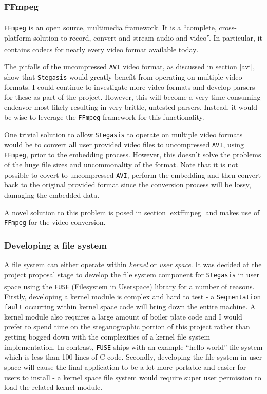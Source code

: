 \documentclass[paper=a4, fontsize=11pt,twoside]{scrartcl}
\numberwithin{table}{section}
\numberwithin{figure}{section}
\numberwithin{algorithm}{section}
\begin{document}
\subsubsection{FFmpeg}
\label{ffmpeg}

\texttt{FFmpeg} is an open source, multimedia framework\textsuperscript{\cite{ffmpeg}}. It is a ``complete, cross-platform solution to record, convert and stream audio and video''. In particular, it contains codecs for nearly every video format available today\textsuperscript{\cite{ffmpegcodec}}.  

The pitfalls of the uncompressed \texttt{AVI} video format, as discussed in section \ref{avi}, show that \texttt{Stegasis} would greatly benefit from operating on multiple video formats. I could continue to investigate more video formats and develop parsers for these as part of the project. However, this will become a very time consuming endeavor most likely resulting in very brittle, untested parsers. Instead, it would be wise to leverage the \texttt{FFmpeg} framework for this functionality.

One trivial solution to allow \texttt{Stegasis} to operate on multiple video formats would be to convert all user provided video files to uncompressed \texttt{AVI}, using \texttt{FFmpeg}, prior to the embedding process. However, this doesn't solve the problems of the huge file sizes and uncommonality of the format. Note that it is not possible to covert to uncompressed \texttt{AVI}, perform the embedding and then convert back to the original provided format since the conversion process will be lossy, damaging the embedded data.

A novel solution to this problem is posed in section \ref{extffmpeg} and makes use of \texttt{FFmpeg} for the video conversion.

\subsubsection{Developing a file system}
\label{fs}

A file system can either operate within \textit{kernel} or \textit{user space}. It was decided at the project proposal stage to develop the file system component for \texttt{Stegasis} in user space using the \texttt{FUSE} (Filesystem in Userspace) library\textsuperscript{\cite{fuse}} for a number of reasons. Firstly, developing a kernel module is complex and hard to test - a \texttt{Segmentation fault} occurring within kernel space code will bring down the entire machine. A kernel module also requires a large amount of boiler plate code and I would prefer to spend time on the steganographic portion of this project rather than getting bogged down with the complexities of a kernel file system implementation. In contrast, \texttt{FUSE} ships with an example ``hello world'' file system which is less than 100 lines of C code. Secondly, developing the file system in user space will cause the final application to be a lot more portable and easier for users to install - a kernel space file system would require super user permission to load the related kernel module.
\end{document}
